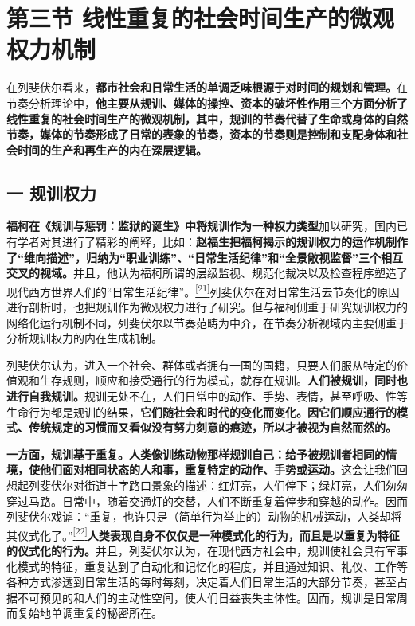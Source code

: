 \documentclass[UTF8, fontset = sourcesans, a4paper, oneside, zihao =
-4, scheme=chinese, no-math, space=true]{ctexbook}
\begin{document}
\protect\hypertarget{part0009_split_003.html}{}{}

\hypertarget{part0009_split_003.htmlux5cux23b016}{\section{第三节
线性重复的社会时间生产的微观权力机制}\label{part0009_split_003.htmlux5cux23b016}}

在列斐伏尔看来，\textbf{都市社会和日常生活的单调乏味根源于对时间的规划和管理。}在节奏分析理论中，\textbf{他主要从规训、媒体的操控、资本的破坏性作用三个方面分析了线性重复的社会时间生产的微观机制，其中，规训的节奏代替了生命或身体的自然节奏，媒体的节奏形成了日常的表象的节奏，资本的节奏则是控制和支配身体和社会时间的生产和再生产的内在深层逻辑。}

\subsection{一 规训权力}\label{part0009_split_003.htmlux5cux23c050}

\textbf{福柯在《规训与惩罚：监狱的诞生》中将规训作为一种权力类型}加以研究，国内已有学者对其进行了精彩的阐释，比如：\textbf{赵福生把福柯揭示的规训权力的运作机制作了``维向描述''，归纳为``职业训练''、``日常生活纪律''和``全景敞视监督''三个相互交叉的视域。}并且，他认为福柯所谓的层级监视、规范化裁决以及检查程序塑造了现代西方世界人们的``日常生活纪律''。\protect\hypertarget{part0009_split_003.htmlux5cux23w21}{}{}\protect\hyperlink{part0009_split_004.htmlux5cux23m21}{\textsuperscript{{[}21{]}}}列斐伏尔在对日常生活去节奏化的原因进行剖析时，也把规训作为微观权力进行了研究。但与福柯侧重于研究规训权力的网络化运行机制不同，列斐伏尔以节奏范畴为中介，在节奏分析视域内主要侧重于分析规训权力的内在生成机制。

列斐伏尔认为，进入一个社会、群体或者拥有一国的国籍，只要人们服从特定的价值观和生存规则，顺应和接受通行的行为模式，就存在规训。\textbf{人们被规训，同时也进行自我规训。}规训无处不在，人们日常中的动作、手势、表情，甚至呼吸、性等生命行为都是规训的结果，\textbf{它们随社会和时代的变化而变化。因它们顺应通行的模式、传统规定的习惯而又看似没有努力刻意的痕迹，所以才被视为自然而然的。}

\textbf{一方面，规训基于重复。人类像训练动物那样规训自己：给予被规训者相同的情境，使他们面对相同状态的人和事，重复特定的动作、手势或运动。}这会让我们回想起列斐伏尔对街道十字路口景象的描述：红灯亮，人们停下；绿灯亮，人们匆匆穿过马路。日常中，随着交通灯的交替，人们不断重复着停步和穿越的动作。因而列斐伏尔戏谑：``重复，也许只是（简单行为举止的）动物的机械运动，人类却将其仪式化了。''\protect\hypertarget{part0009_split_003.htmlux5cux23w22}{}{}\protect\hyperlink{part0009_split_004.htmlux5cux23m22}{\textsuperscript{{[}22{]}}}\textbf{人类表现自身不仅仅是一种模式化的行为，而且是以重复为特征的仪式化的行为。}并且，列斐伏尔认为，在现代西方社会中，规训使社会具有军事化模式的特征，重复达到了自动化和记忆化的程度，并且通过知识、礼仪、工作等各种方式渗透到日常生活的每时每刻，决定着人们日常生活的大部分节奏，甚至占据不可预见的和人们的主动性空间，使人们日益丧失主体性。因而，规训是日常周而复始地单调重复的秘密所在。
\end{document}
